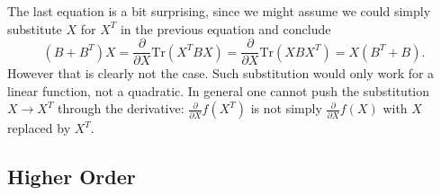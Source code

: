 The last equation is a bit surprising, since we might assume
we could simply substitute $X$ for $X^T$ in the previous equation
and conclude
\[
   (B+B^T)X
   =
   \frac{\partial}{\partial X} \mathrm{Tr}(X^T B X)
   =
   \frac{\partial}{\partial X} \mathrm{Tr}(X B X^T)
   = X(B^T + B).
\]
However that is clearly not the case.
Such substitution would only work for a linear function, not a quadratic.
In general one cannot push the substitution $X \to X^T$ through the derivative:
$\frac{\partial}{\partial X} f(X^T)$ is not simply
$\frac{\partial}{\partial X} f(X)$ with $X$ replaced by $X^T$.

\subsection{Higher Order}



